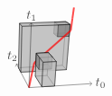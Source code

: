 \documentclass[orivec]{llncs} \usepackage[T1]{fontenc}
\begin{document}
{\begin{example}
\[\begin{tikzpicture}[line join=round,opacity=0.7]
\draw[arrows=->](.786,-.786)--(.435,-.115);
\filldraw[fill=gray](1.479,.73)--(1.794,.743)--(1.819,1.061)--(1.5,1.05)--cycle;
\filldraw[fill=lightgray](.496,-.231)--(1.723,-.164)--(1.819,1.061)--(.524,1.017)--cycle;
\filldraw[fill=lightgray](1.831,-.283)--(1.935,.982)--(1.819,1.061)--(1.723,-.164)--cycle;
\filldraw[fill=lightgray](.561,-.354)--(1.831,-.283)--(1.723,-.164)--(.496,-.231)--cycle;
\filldraw[fill=lightgray](.561,-.354)--(.593,.934)--(.524,1.017)--(.496,-.231)--cycle;
\draw[line width=0.5mm,color=red](1.999,1.148)--(2.042,1.461);
\filldraw[fill=gray](1.908,.652)--(1.935,.982)--(1.819,1.061)--(1.794,.743)--cycle;
\filldraw[fill=gray](1.583,.639)--(1.908,.652)--(1.794,.743)--(1.479,.73)--cycle;
\filldraw[fill=gray](1.583,.639)--(1.605,.97)--(1.5,1.05)--(1.479,.73)--cycle;
\filldraw[fill=lightgray](.561,-.354)--(1.831,-.283)--(1.935,.982)--(.593,.934)--cycle;
\filldraw[fill=gray](1.605,.97)--(1.935,.982)--(1.819,1.061)--(1.5,1.05)--cycle;
\filldraw[fill=lightgray](.593,.934)--(1.935,.982)--(1.819,1.061)--(.524,1.017)--cycle;
\draw[line width=0.5mm,color=red](1.954,.817)--(1.999,1.148);
\filldraw[fill=gray](1.583,.639)--(1.908,.652)--(1.935,.982)--(1.605,.97)--cycle;
\draw[line width=0.5mm,color=red](.936,-.089)--(1.954,.817);
\filldraw[fill=lightgray](.964,-.468)--(1.295,-.448)--(1.333,.192)--(.993,.175)--cycle;
\filldraw[fill=gray](1.416,-.263)--(1.437,.072)--(1.333,.192)--(1.314,-.133)--cycle;
\filldraw[fill=lightgray](1.503,-.741)--(1.55,-.057)--(1.333,.192)--(1.295,-.448)--cycle;
\filldraw[fill=lightgray](1.147,-.763)--(1.503,-.741)--(1.295,-.448)--(.964,-.468)--cycle;
\draw[line width=0.5mm,color=red](.908,-.219)--(.936,-.089);
\filldraw[fill=gray](1.068,-.283)--(1.416,-.263)--(1.314,-.133)--(.978,-.151)--cycle;
\filldraw[fill=gray](.978,-.151)--(1.314,-.133)--(1.333,.192)--(.993,.175)--cycle;
\filldraw[fill=gray](1.068,-.283)--(1.416,-.263)--(1.437,.072)--(1.084,.055)--cycle;
\filldraw[fill=lightgray](1.147,-.763)--(1.183,-.076)--(.993,.175)--(.964,-.468)--cycle;
\draw[line width=0.5mm,color=red](.786,-.786)--(.908,-.219);
\filldraw[fill=gray](1.068,-.283)--(1.084,.055)--(.993,.175)--(.978,-.151)--cycle;
\filldraw[fill=gray](1.084,.055)--(1.437,.072)--(1.333,.192)--(.993,.175)--cycle;
\filldraw[fill=lightgray](1.183,-.076)--(1.55,-.057)--(1.333,.192)--(.993,.175)--cycle;
\draw[arrows=->](.786,-.786)--(2.547,-.674);
\filldraw[fill=lightgray](1.147,-.763)--(1.503,-.741)--(1.55,-.057)--(1.183,-.076)--cycle;
\draw[arrows=->](.786,-.786)--(.853,1.028);
\draw (2.786,-.659) node {$t_0$};\draw (.86,1.226) node {$t_1$};\draw (.326,.094) node {$t_2$};\end{tikzpicture}   \hspace{-1ex}
\]
\end{example}}
\end{document}
